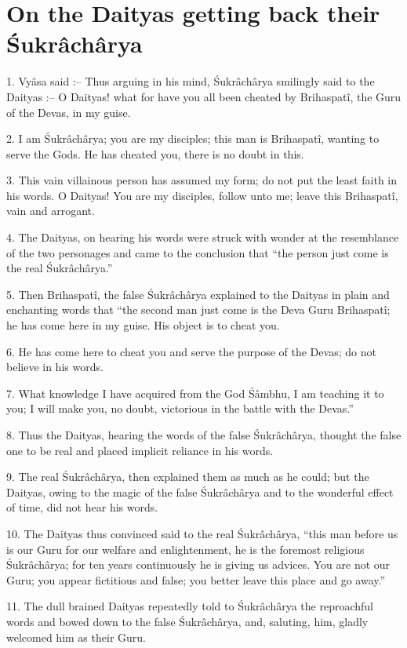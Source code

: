 ﻿\chapter{On the Daityas getting back their \'Sukr\^ach\^arya}

1. Vy\^asa said :-- Thus arguing in his mind, \'Sukr\^ach\^arya smilingly said to the Daityas :-- O Daityas! what for have you all been cheated by Brihaspat\^i, the Guru of the Devas, in my guise.

2. I am \'Sukr\^ach\^arya; you are my disciples; this man is Brihaspat\^i, wanting to serve the Gods. He has cheated you, there is no doubt in this.

3. This vain villainous person has assumed my form; do not put the least faith in his words. O Daityas! You are my disciples, follow unto me; leave this Brihaspat\^i, vain and arrogant.

4. The Daityas, on hearing his words were struck with wonder at the resemblance of the two personages and came to the conclusion that ``the person just come is the real \'Sukr\^ach\^arya.''

5. Then Brihaspat\^i, the false \'Sukr\^ach\^arya explained to the Daityas in plain and enchanting words that ``the second man just come is the Deva Guru Brihaspat\^i; he has come here in my guise. His object is to cheat you.

6. He has come here to cheat you and serve the purpose of the Devas; do not believe in his words.

7. What knowledge I have acquired from the God \'S\^ambhu, I am teaching it to you; I will make you, no doubt, victorious in the battle with the Devas.''

8. Thus the Daityas, hearing the words of the false \'Sukr\^ach\^arya, thought the false one to be real and placed implicit reliance in his words.

9. The real \'Sukr\^ach\^arya, then explained them as much as he could; but the Daityas, owing to the magic of the false \'Sukr\^ach\^arya and to the wonderful effect of time, did not hear his words.

10. The Daityas thus convinced said to the real \'Sukr\^ach\^arya, ``this man before us is our Guru for our welfare and enlightenment, he is the foremost religious \'Sukr\^ach\^arya; for ten years continuously he is giving us advices. You are not our Guru; you appear fictitious and false; you better leave this place and go away.''

11. The dull brained Daityas repeatedly told to \'Sukr\^ach\^arya the reproachful words and bowed down to the false \'Sukr\^ach\^arya, and, saluting, him, gladly welcomed him as their Guru.

